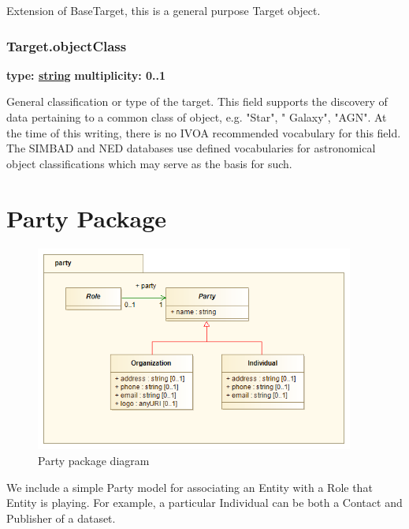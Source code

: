 Extension of BaseTarget, this is a general purpose Target object.

  \subsubsection{Target.objectClass}
  \textbf{type: \hyperref[sect:ivoa]{string}} \newline
  \textbf{multiplicity: 0..1} \newline

  General classification or type of the target. This field supports the
  discovery of data pertaining to a common class of object, e.g. "Star", "
  Galaxy", "AGN". At the time of this writing, there is no IVOA recommended
  vocabulary for this field. The SIMBAD and NED databases use defined
  vocabularies for astronomical object classifications which may serve as the
  basis for such.

\pagebreak
\section{Party Package}
\label{sect:party_pkg}

\begin{figure}[h]
\begin{center}
  \includegraphics[width=4.125in]{diagrams/Party.png}
  \caption{Party package diagram}\label{fig:party}
\end{center}
\end{figure}

We include a simple Party model for associating an Entity with a Role that
Entity is playing. For example, a particular Individual can be both a
Contact and Publisher of a dataset.

